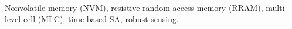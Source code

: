 \begin{IEEEkeywords}
Nonvolatile memory (NVM), 
resistive random access memory (RRAM),
multi-level cell (MLC),
time-based SA,
robust sensing.
\end{IEEEkeywords}